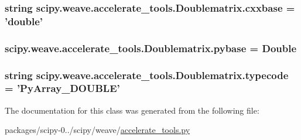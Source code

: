 \subsubsection[{cxxbase}]{\setlength{\rightskip}{0pt plus 5cm}string scipy.\+weave.\+accelerate\+\_\+tools.\+Doublematrix.\+cxxbase = 'double'\hspace{0.3cm}{\ttfamily [static]}}\label{classscipy_1_1weave_1_1accelerate__tools_1_1Doublematrix_add9e64b58e6df82974943be52faf75d6}
\hypertarget{classscipy_1_1weave_1_1accelerate__tools_1_1Doublematrix_ab802752d039c36dd548c4b7f0f875fe5}{}
\subsubsection[{pybase}]{\setlength{\rightskip}{0pt plus 5cm}scipy.\+weave.\+accelerate\+\_\+tools.\+Doublematrix.\+pybase = {\bf Double}\hspace{0.3cm}{\ttfamily [static]}}\label{classscipy_1_1weave_1_1accelerate__tools_1_1Doublematrix_ab802752d039c36dd548c4b7f0f875fe5}
\hypertarget{classscipy_1_1weave_1_1accelerate__tools_1_1Doublematrix_a593514311f286e9e00262508e33678f1}{}
\subsubsection[{typecode}]{\setlength{\rightskip}{0pt plus 5cm}string scipy.\+weave.\+accelerate\+\_\+tools.\+Doublematrix.\+typecode = 'Py\+Array\+\_\+\+D\+O\+U\+B\+L\+E'\hspace{0.3cm}{\ttfamily [static]}}\label{classscipy_1_1weave_1_1accelerate__tools_1_1Doublematrix_a593514311f286e9e00262508e33678f1}


The documentation for this class was generated from the following file\+:\begin{DoxyCompactItemize}
\item 
packages/scipy-\/0../scipy/weave/\hyperlink{accelerate__tools_8py}{accelerate\+\_\+tools.\+py}\end{DoxyCompactItemize}
